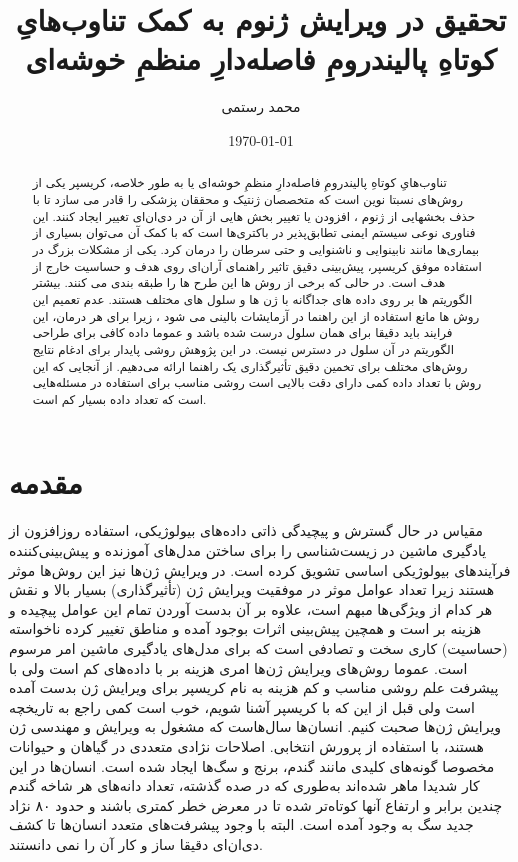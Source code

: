 \documentclass[12pt,a4paper,BCOR=.7cm,headsepline,bibliography=totoc]{report}
\title{تحقیق در ویرایش ژنوم به کمک تناوب‌هایِ کوتاهِ پالیندرومِ فاصله‌دارِ منظمِ خوشه‌ای}
\author{محمد رستمی }
\date{\today}
\begin{document}
\makethesistitle
{}
\begin{abstract}
تناوب‌هایِ کوتاهِ پالیندرومِ فاصله‌دارِ منظمِ خوشه‌ای یا به طور خلاصه، کریسپر  یکی از روش‌های نسبتا نوین است که متخصصان ژنتیک و محققان پزشکی را قادر می سازد تا با حذف بخشهایی از ژنوم ،
افزودن یا تغییر بخش هایی از آن در دی‌ان‌ای  تغییر ایجاد کنند. این فناوری نوعی سیستم ایمنی تطابق‌پذیر در باکتری‌ها است که با کمک آن می‌توان بسیاری از بیماری‌ها مانند نابینوایی و ناشنوایی و حتی سرطان را درمان کرد. یکی از مشکلات بزرگ در استفاده موفق کریسپر، پیش‌بینی دقیق تاثیر راهنمای آر‌ان‌ای  روی هدف و حساسیت خارج از هدف است. در حالی که برخی از روش ها این طرح ها را طبقه بندی می کنند. بیشتر
الگوریتم ها بر روی داده های جداگانه با ژن ها و سلول های مختلف هستند. عدم تعمیم این روش ها
مانع استفاده از این راهنما در آزمایشات بالینی می شود ، زیرا برای هر درمان، این فرایند باید دقیقا برای همان سلول درست شده باشد و عموما داده کافی برای طراحی الگوریتم در آن سلول در دسترس نیست. در این پژوهش روشی پایدار برای ادغام نتایج روش‌های مختلف برای تخمین دقیق تأثیرگذاری یک راهنما ارائه می‌دهیم. از آنجایی که این روش با تعداد داده کمی دارای دقت بالایی است روشی مناسب برای استفاده در مسئله‌هایی است که تعداد داده بسیار کم است.
\end{abstract}
\pagestyle{plain}

\tableofcontents{} \listoffigures{}
\chapter{مقدمه}
\pagestyle{fancy} 
مقیاس در حال گسترش و پیچیدگی ذاتی داده‌های بیولوژیکی، استفاده روزافزون از یادگیری ماشین در زیست‌شناسی را برای ساختن مدل‌های آموزنده و پیش‌بینی‌کننده فرآیندهای بیولوژیکی اساسی تشویق کرده است. در ویرایش ژن‌ها نیز این روش‌ها موثر هستند زیرا تعداد عوامل موثر در موفقیت ویرایش ژن (تأثیرگذاری) بسیار بالا و نقش هر کدام از ویژگی‌ها مبهم است، علاوه بر آن بدست آوردن تمام این عوامل پیچیده و هزینه بر است و همچین پیش‌بینی اثرات بوجود آمده و مناطق تغییر کرده ناخواسته (حساسیت) کاری سخت و تصادفی است که برای مدل‌های یادگیری ماشین امر مرسوم است. عموما روش‌های ویرایش ژن‌ها امری هزینه بر با داده‌های کم است ولی با پیشرفت علم روشی مناسب و کم هزینه به نام کریسپر برای ویرایش ژن بدست آمده است ولی قبل از این که با کریسپر آشنا شویم، خوب است کمی راجع به تاریخچه ویرایش ژن‌ها صحبت کنیم. انسان‌ها سال‌هاست که مشغول به ویرایش و مهندسی ژن هستند، با استفاده از پرورش انتخابی.
	اصلاحات نژادی متعددی در گیاهان و حیوانات مخصوصا گونه‌های کلیدی مانند گندم، برنج و سگ‌ها ایجاد شده است. انسان‌ها در این کار شدیدا ماهر شده‌اند به‌طوری که در صده گذشته، تعداد دانه‌های هر شاخه گندم چندین برابر و ارتفاع آنها کوتاه‌تر شده تا در معرض خطر کمتری باشند و حدود ۸۰ نژاد جدید سگ به وجود آمده است. البته با وجود پیشرفت‌های متعدد انسان‌ها تا کشف دی‌ان‌ای دقیقا ساز و کار آن را نمی دانستند. 
\end{document}
